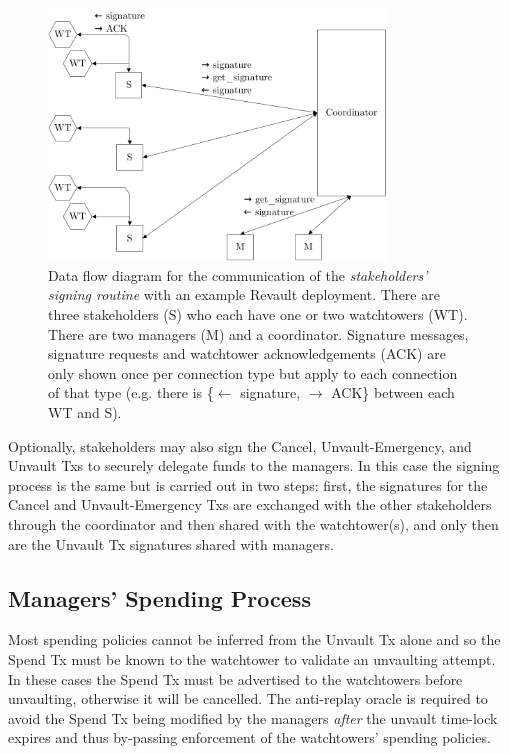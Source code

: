 \documentclass[runningheads]{llncs}
\begin{document}
\begin{figure}[t]
\centering
    \includegraphics[width=9cm]{sig_exchange_diagram.png}
    \caption{Data flow diagram for the communication of the \textit{stakeholders' signing routine} with an example Revault deployment. There are three stakeholders (S) who each have one or two watchtowers (WT). There are two managers (M) and a coordinator. Signature messages, signature requests and watchtower acknowledgements (ACK) are only shown once per connection type but apply to each connection of that type (e.g. there is \{$\leftarrow$ signature, $\rightarrow$ ACK\} between each WT and S).}
    \label{fig:sig_exchange_diagram}
\end{figure}

Optionally, stakeholders may also sign the Cancel, Unvault-Emergency, and Unvault Txs to securely delegate funds to the managers. In this case the signing process is the same but is carried out in two steps: first, the signatures for the Cancel and Unvault-Emergency Txs are exchanged with the other stakeholders through the coordinator and then shared with the watchtower(s), and only then are the Unvault Tx signatures shared with managers.

\subsection{Managers' Spending Process}

Most spending policies cannot be inferred from the Unvault Tx alone and so the Spend Tx must be known to the watchtower to validate an unvaulting attempt. In these cases the Spend Tx must be advertised to the watchtowers before unvaulting, otherwise it will be cancelled. The anti-replay oracle is required to avoid the Spend Tx being modified by the managers \textit{after} the unvault time-lock expires and thus by-passing enforcement of the watchtowers' spending policies.
\end{document}

